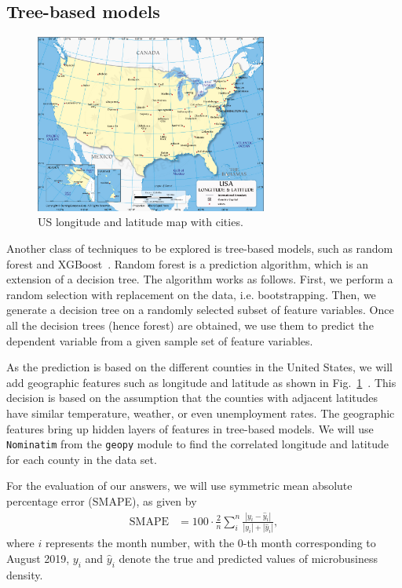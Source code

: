 \documentclass[prl,aps,superscriptaddress,twocolumn,10pt,nolongbibliography]{revtex4-2}
\begin{document}
\subsection{Tree-based models}
\begin{figure}
\includegraphics[width=3in]{figs/geomap.jpg}
\caption{\label{fig:geomap}
US longitude and latitude map with cities.
}
\end{figure}

Another class of techniques to be explored is tree-based models, such as random forest and XGBoost~\cite{chen2016xgboost}.
Random forest is a prediction algorithm, which is an extension of a decision tree. 
The algorithm works as follows. First, we perform a random selection with replacement on the data, i.e. bootstrapping. 
Then, we generate a decision tree on a randomly selected subset of feature variables. 
Once all the decision trees (hence forest) are obtained, we use them to predict the dependent variable from a given sample set of feature variables.

As the prediction is based on the different counties in the United States, we will add geographic features such as longitude and latitude as shown in Fig.~\ref{fig:geomap}~\cite{geomap}. 
This decision is based on the assumption that the counties with adjacent latitudes have similar temperature, weather, or even unemployment rates. 
The geographic features bring up hidden layers of features in tree-based models.
We will use \texttt{Nominatim} from the \texttt{geopy} module to find the correlated longitude and latitude for each county in the data set.

For the evaluation of our answers, we will use symmetric mean absolute percentage error (SMAPE), as given by
\begin{align}
\textrm{SMAPE} &= 100 \cdot \frac{2}{n} \sum_{i}^n \frac{|y_i - \hat{y}_i|}{|y_i| + |\hat{y}_i|},
\end{align}
where $i$ represents the month number, with the 0-th month corresponding to August 2019, $y_i$ and $\hat{y}_i$ denote the true and predicted values of microbusiness density.
\end{document}
